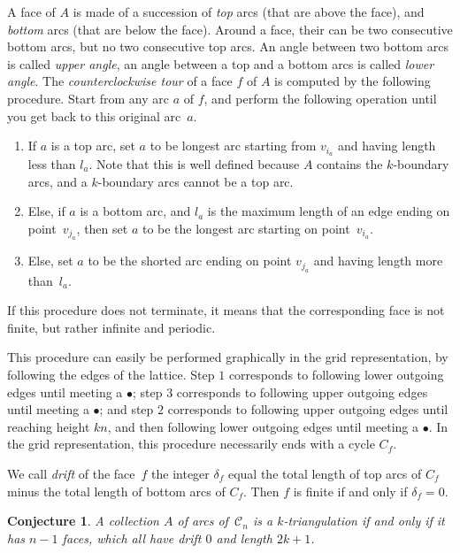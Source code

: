 \documentclass{amsart}
\newtheorem{conjecture}[theorem]{Conjecture}
\theoremstyle{remark}
\newcommand{\cylinder}{\mathcal{C}}
\begin{document}
A face of $A$ is made of a succession of \emph{top} arcs (that are above the face), and \emph{bottom} arcs (that are below the face). Around a face, their can be two consecutive bottom arcs, but no two consecutive top arcs. An angle between two bottom arcs is called \emph{upper angle}, an angle between a top and a bottom arcs is called \emph{lower angle}.
The \emph{counterclockwise tour} of a face $f$ of $A$ is computed by the following procedure. Start from any arc $a$ of $f$, and perform the following operation until you get back to this original arc~$a$.
\begin{enumerate}
\item If $a$ is a top arc, set $a$ to be longest arc starting from $v_{i_a}$ and having length less than $l_a$. Note that this is well defined because $A$ contains the $k$-boundary arcs, and a $k$-boundary arcs cannot be a top arc.
\item Else, if $a$ is a bottom arc, and $l_a$ is the maximum length of an edge ending on point~$v_{j_a}$, then set $a$ to be the longest arc starting on point~$v_{i_a}$.
\item Else, set $a$ to be the shorted arc ending on point $v_{j_a}$ and having length more than~$l_a$.
\end{enumerate}
If this procedure does not terminate, it means that the corresponding face is not finite, but rather infinite and periodic.

This procedure can easily be performed graphically in the grid representation, by following the edges of the lattice. Step $1$ corresponds to following lower outgoing edges until meeting a $\bullet$; step $3$ corresponds to following upper outgoing edges until meeting a $\bullet$; and step $2$ corresponds to following upper outgoing edges until reaching height $kn$, and then following lower outgoing edges until meeting a $\bullet$.
In the grid representation, this procedure necessarily ends with a cycle $C_f$.

We call \emph{drift} of the face~$f$ the integer $\delta_f$ equal the total length of top arcs of $C_f$ minus the total length of bottom arcs of $C_f$.
Then $f$ is finite if and only if $\delta_f=0$.

\begin{conjecture}
\label{conj:characterizationDots}
A collection $A$ of arcs of~$\cylinder_n$ is a $k$-triangulation if and only if it has $n-1$ faces, which all have drift $0$ and length $2k+1$.
\end{conjecture}
\end{document}
